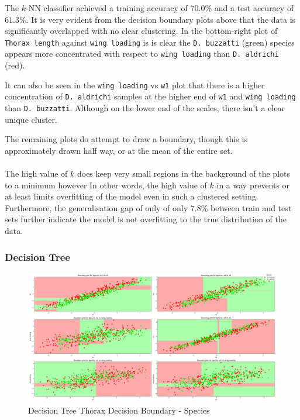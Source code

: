 \documentclass{article}
\begin{document}
The $k$-NN classifier achieved a training accuracy of $70.0\%$ and a test accuracy of $61.3\%$. It is very evident from the decision boundary plots above that the data is significantly overlapped with no clear clustering. In the bottom-right plot of \texttt{Thorax length} against \texttt{wing loading} is is clear the \texttt{D. buzzatti} (green) species appears more concentrated with respect to \texttt{wing loading} than \texttt{D. aldrichi} (red). 

It can also be seen in the \texttt{wing loading} vs \texttt{w1} plot that there is a higher concentration of \texttt{D. aldrichi} samples at the higher end of \texttt{w1} and \texttt{wing loading} than \texttt{D. buzzatti}. Although on the lower end of the scales, there isn't a clear unique cluster. 

The remaining plots do attempt to draw a boundary, though this is approximately drawn half way, or at the mean of the entire set. \\
\\
The high value of $k$ does keep very small regions in the background of the plots to a minimum however In other words, the high value of $k$ in a way prevents or at least limits overfitting of the model even in such a clustered setting. Furthermore, the generalisation gap of only of only $7.8\%$ between train and test sets further indicate the model is not overfitting to the true distribution of the data.
\newpage
\subsubsection{Decision Tree}


\begin{figure}[htb]
    \centering
    \includegraphics[width=0.8\columnwidth]{plots/dt_Thorax_decision_boundaries_Species.png}
    \caption{Decision Tree Thorax Decision Boundary - Species}
    \label{fig:dt_thorax_db_species}
\end{figure}
\end{document}

